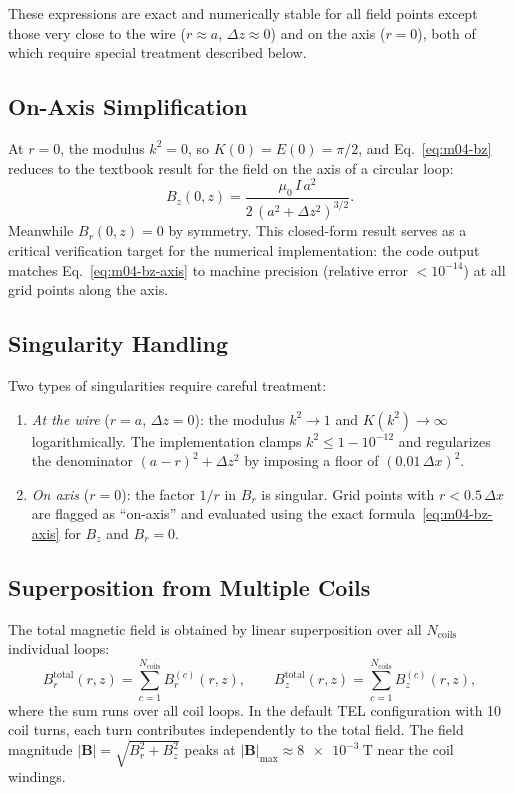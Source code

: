 \documentclass[11pt,a4paper]{report}
\newcommand{\dx}{\Delta x}
\begin{document}
These expressions are exact and numerically stable for all field points except those very close to the wire ($r \approx a$, $\Delta z \approx 0$) and on the axis ($r = 0$), both of which require special treatment described below.

\subsection{On-Axis Simplification}

At $r = 0$, the modulus $k^2 = 0$, so $K(0) = E(0) = \pi/2$, and Eq.~\eqref{eq:m04-bz} reduces to the textbook result for the field on the axis of a circular loop:
\begin{equation}
  B_z(0, z) = \frac{\mu_0\,I\,a^2}{2\,(a^2 + \Delta z^2)^{3/2}}.
  \label{eq:m04-bz-axis}
\end{equation}
Meanwhile $B_r(0,z) = 0$ by symmetry.  This closed-form result serves as a critical verification target for the numerical implementation: the code output matches Eq.~\eqref{eq:m04-bz-axis} to machine precision (relative error $< 10^{-14}$) at all grid points along the axis.

\subsection{Singularity Handling}

Two types of singularities require careful treatment:
\begin{enumerate}
  \item \emph{At the wire} ($r = a$, $\Delta z = 0$): the modulus $k^2 \to 1$ and $K(k^2) \to \infty$ logarithmically.  The implementation clamps $k^2 \le 1 - 10^{-12}$ and regularizes the denominator $(a-r)^2 + \Delta z^2$ by imposing a floor of $(0.01\,\dx)^2$.
  \item \emph{On axis} ($r = 0$): the factor $1/r$ in $B_r$ is singular.  Grid points with $r < 0.5\,\dx$ are flagged as ``on-axis'' and evaluated using the exact formula~\eqref{eq:m04-bz-axis} for $B_z$ and $B_r = 0$.
\end{enumerate}

\subsection{Superposition from Multiple Coils}

The total magnetic field is obtained by linear superposition over all $N_\mathrm{coils}$ individual loops:
\begin{equation}
  B_r^\mathrm{total}(r,z) = \sum_{c=1}^{N_\mathrm{coils}} B_r^{(c)}(r,z), \qquad
  B_z^\mathrm{total}(r,z) = \sum_{c=1}^{N_\mathrm{coils}} B_z^{(c)}(r,z),
  \label{eq:m04-superposition}
\end{equation}
where the sum runs over all coil loops.  In the default TEL configuration with 10 coil turns, each turn contributes independently to the total field.  The field magnitude $|\mathbf{B}| = \sqrt{B_r^2 + B_z^2}$ peaks at $|\mathbf{B}|_\mathrm{max} \approx \SI{8e-3}{\tesla}$ near the coil windings.
\end{document}
